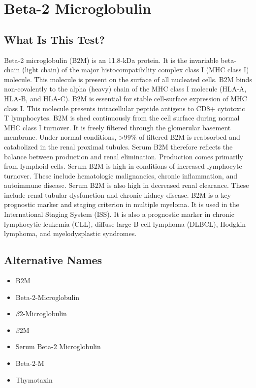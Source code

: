 \chapter{Beta-2 Microglobulin}

\section*{What Is This Test?}
Beta-2 microglobulin (B2M) is an 11.8-kDa protein. It is the invariable beta-chain (light chain) of the major histocompatibility complex class I (MHC class I) molecule. This molecule is present on the surface of all nucleated cells. B2M binds non-covalently to the alpha (heavy) chain of the MHC class I molecule (HLA-A, HLA-B, and HLA-C). B2M is essential for stable cell-surface expression of MHC class I. This molecule presents intracellular peptide antigens to CD8+ cytotoxic T lymphocytes. B2M is shed continuously from the cell surface during normal MHC class I turnover. It is freely filtered through the glomerular basement membrane. Under normal conditions, >99\% of filtered B2M is reabsorbed and catabolized in the renal proximal tubules. Serum B2M therefore reflects the balance between production and renal elimination. Production comes primarily from lymphoid cells. Serum B2M is high in conditions of increased lymphocyte turnover. These include hematologic malignancies, chronic inflammation, and autoimmune disease. Serum B2M is also high in decreased renal clearance. These include renal tubular dysfunction and chronic kidney disease. B2M is a key prognostic marker and staging criterion in multiple myeloma. It is used in the International Staging System (ISS). It is also a prognostic marker in chronic lymphocytic leukemia (CLL), diffuse large B-cell lymphoma (DLBCL), Hodgkin lymphoma, and myelodysplastic syndromes.

\section*{Alternative Names}
\begin{itemize}
  \item B2M
  \item Beta-2-Microglobulin
  \item $\beta$2-Microglobulin
  \item $\beta$2M
  \item Serum Beta-2 Microglobulin
  \item Beta-2-M
  \item Thymotaxin
\end{itemize}
